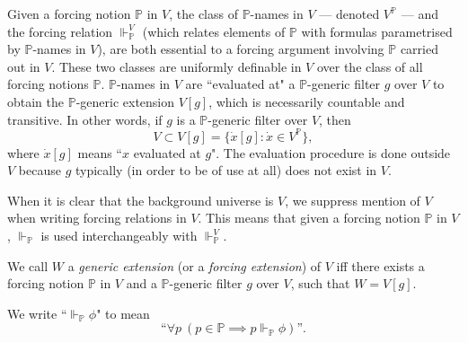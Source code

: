 \documentclass[12pt]{article}
\numberwithin{equation}{section}
\begin{document}
Given a forcing notion $\mathbb{P}$ in $V$, the class of $\mathbb{P}$-names in $V$ --- denoted $V^{\mathbb{P}}$ --- and the forcing relation $\Vdash_{\mathbb{P}}^V$ (which relates elements of $\mathbb{P}$ with formulas parametrised by $\mathbb{P}$-names in $V$), are both essential to a forcing argument involving $\mathbb{P}$ carried out in $V$. These two classes are uniformly definable in $V$ over the class of all forcing notions $\mathbb{P}$. $\mathbb{P}$-names in $V$ are ``evaluated at" a $\mathbb{P}$-generic filter $g$ over $V$ to obtain the $\mathbb{P}$-generic extension $V[g]$, which is necessarily countable and transitive. In other words, if $g$ is a $\mathbb{P}$-generic filter over $V$, then
\begin{equation*}
    V \subset V[g] = \{\dot{x}[g] : \dot{x} \in V^{\mathbb{P}}\},
\end{equation*}
where $\dot{x}[g]$ means ``$x$ evaluated at $g$". The evaluation procedure is done outside $V$ because $g$ typically (in order to be of use at all) does not exist in $V$. 

\begin{con}
When it is clear that the background universe is $V$, we suppress mention of $V$ when writing forcing relations in $V$. This means that given a forcing notion $\mathbb{P}$ in $V$, $\Vdash_{\mathbb{P}}$ is used interchangeably with $\Vdash_{\mathbb{P}}^V$.
\end{con}

\begin{defi}
We call $W$ a \emph{generic extension} (or a \emph{forcing extension}) of $V$ iff there exists a forcing notion $\mathbb{P}$ in $V$ and a $\mathbb{P}$-generic filter $g$ over $V$, such that $W = V[g]$.
\end{defi}

\begin{defi}
We write ``$\Vdash_{\mathbb{P}} \phi$" to mean $$\text{``} \forall p \ (p \in \mathbb{P} \implies p \Vdash_{\mathbb{P}} \phi) \text{''.}$$ 
\end{defi}
\end{document}
